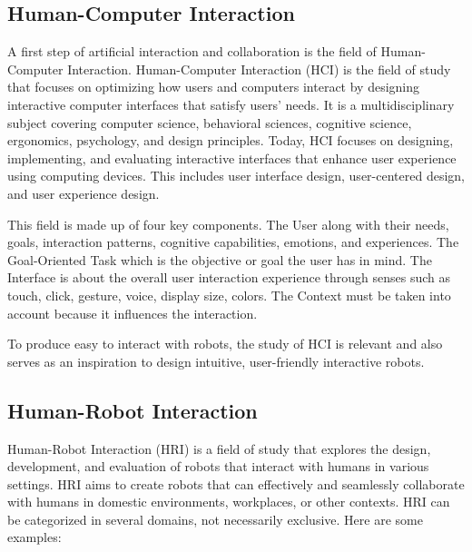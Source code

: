 \subsection{Human-Computer Interaction}

A first step of artificial interaction and collaboration is the field of Human-Computer Interaction. Human-Computer Interaction (HCI) is the field of study that focuses on optimizing how users and computers interact by designing interactive computer interfaces that satisfy users' needs. It is a multidisciplinary subject covering computer science, behavioral sciences, cognitive science, ergonomics, psychology, and design principles.
Today, HCI focuses on designing, implementing, and evaluating interactive interfaces that enhance user experience using computing devices. This includes user interface design, user-centered design, and user experience design. 

This field is made up of four key components. 
The User along with their needs, goals, interaction patterns, cognitive capabilities, emotions, and experiences.
The Goal-Oriented Task which is the objective or goal the user has in mind.
The Interface is about the overall user interaction experience through senses such as touch, click, gesture, voice, display size, colors.
The Context must be taken into account because it influences the interaction. 

To produce easy to interact with robots, the study of HCI is relevant and also serves as an inspiration to design intuitive, user-friendly interactive robots.

\subsection{Human-Robot Interaction}



Human-Robot Interaction (HRI) is a field of study that explores the design, development, and evaluation of robots that interact with humans in various settings. HRI aims to create robots that can effectively and seamlessly collaborate with humans in domestic environments, workplaces, or other contexts. 
HRI can be categorized in several domains, not necessarily exclusive. Here are some examples:

